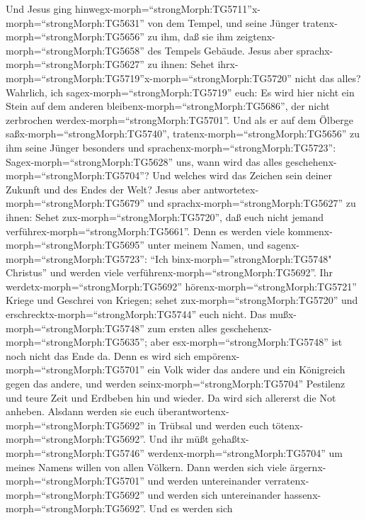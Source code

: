  Und Jesus ging
hinwegx-morph=``strongMorph:TG5711''x-morph=``strongMorph:TG5631'' von
dem Tempel, und seine Jünger tratenx-morph=``strongMorph:TG5656'' zu
ihm, daß sie ihm zeigtenx-morph=``strongMorph:TG5658'' des Tempels
Gebäude.  Jesus aber sprachx-morph=``strongMorph:TG5627'' zu
ihnen: Sehet
ihrx-morph=``strongMorph:TG5719''\textbar x-morph=``strongMorph:TG5720''
nicht das alles? Wahrlich, ich sagex-morph=``strongMorph:TG5719'' euch:
Es wird hier nicht ein Stein auf dem anderen
bleibenx-morph=``strongMorph:TG5686'', der nicht zerbrochen
werdex-morph=``strongMorph:TG5701''.  Und als er auf dem
Ölberge saßx-morph=``strongMorph:TG5740'',
tratenx-morph=``strongMorph:TG5656'' zu ihm seine Jünger besonders und
sprachenx-morph=``strongMorph:TG5723'':
Sagex-morph=``strongMorph:TG5628'' uns, wann wird das alles
geschehenx-morph=``strongMorph:TG5704''? Und welches wird das Zeichen
sein deiner Zukunft und des Endes der Welt?  Jesus aber
antwortetex-morph=``strongMorph:TG5679'' und
sprachx-morph=``strongMorph:TG5627'' zu ihnen: Sehet
zux-morph=``strongMorph:TG5720'', daß euch nicht jemand
verführex-morph=``strongMorph:TG5661''.  Denn es werden
viele kommenx-morph=``strongMorph:TG5695'' unter meinem Namen, und
sagenx-morph=``strongMorph:TG5723'': ``Ich
binx-morph=''strongMorph:TG5748" Christus'' und werden viele
verführenx-morph=``strongMorph:TG5692''.  Ihr
werdetx-morph=``strongMorph:TG5692'' hörenx-morph=``strongMorph:TG5721''
Kriege und Geschrei von Kriegen; sehet zux-morph=``strongMorph:TG5720''
und erschrecktx-morph=``strongMorph:TG5744'' euch nicht. Das
mußx-morph=``strongMorph:TG5748'' zum ersten alles
geschehenx-morph=``strongMorph:TG5635''; aber
esx-morph=``strongMorph:TG5748'' ist noch nicht das Ende da.
 Denn es wird sich empörenx-morph=``strongMorph:TG5701'' ein
Volk wider das andere und ein Königreich gegen das andere, und werden
seinx-morph=``strongMorph:TG5704'' Pestilenz und teure Zeit und Erdbeben
hin und wieder.  Da wird sich allererst die Not anheben.
 Alsdann werden sie euch
überantwortenx-morph=``strongMorph:TG5692'' in Trübsal und werden euch
tötenx-morph=``strongMorph:TG5692''. Und ihr müßt
gehaßtx-morph=``strongMorph:TG5746''
werdenx-morph=``strongMorph:TG5704'' um meines Namens willen von allen
Völkern.  Dann werden sich viele
ärgernx-morph=``strongMorph:TG5701'' und werden untereinander
verratenx-morph=``strongMorph:TG5692'' und werden sich untereinander
hassenx-morph=``strongMorph:TG5692''.  Und es werden sich
